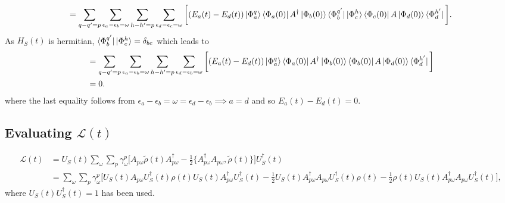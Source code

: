 \documentclass[10pt]{article}
\numberwithin{equation}{section}
\begin{document}
\begin{equation}
[H_{S},H_{LS}] =  \sum_{q-q' = p} \sum_{\epsilon_{a}-\epsilon_{b} = \omega}  \sum_{h-h' = p} \sum_{\epsilon_{d}-\epsilon_{c} = \omega}\bigg[(E_{a}(t)-E_{d}(t))\ket{\Phi_{a}^{q}}  \bra{\Phi_{a}(0)}A^{\dagger}\ket{\Phi_{b}(0)}\bra{\Phi_{b}^{q'}}\ket{\Phi_{c}^{h}}\bra{\Phi_{c}(0)}A\ket{\Phi_{d}(0)}\bra{\Phi_{d}^{h'}}\bigg].
\end{equation}
As $H_{S}(t)$ is hermitian, $\bra{\Phi_{b}^{q'}}\ket{\Phi_{c}^{h}} = \delta_{bc}$ which leads to 
\begin{align}
[H_{S},H_{LS}] &=  \sum_{q-q' = p} \sum_{\epsilon_{a}-\epsilon_{b} = \omega}  \sum_{h-h' = p} \sum_{\epsilon_{d}-\epsilon_{b} = \omega}\bigg[(E_{a}(t)-E_{d}(t))\ket{\Phi_{a}^{q}}  \bra{\Phi_{a}(0)}A^{\dagger}\ket{\Phi_{b}(0)}\bra{\Phi_{b}(0)}A\ket{\Phi_{d}(0)}\bra{\Phi_{d}^{h'}}\bigg] \\
                      &= 0.
\end{align}
where the last equality follows from $\epsilon_{a}-\epsilon_{b} = \omega = \epsilon_{d}-\epsilon_{b} \implies a=d$ and so $E_{a}(t)-E_{d}(t)=0$.








\subsection{Evaluating $\mathcal{L}(t)$}
\begin{align} \label{eq:24}
\mathcal{L}(t) &= U_{S}(t)\sum_{\omega}\sum_{p}\gamma_{\omega}^{p} \bigg[A_{p\omega}\tilde{\rho}(t)A_{p\omega}^{\dagger} - \frac{1}{2}\{A_{p\omega}^{\dagger}A_{p\omega},\tilde{\rho}(t)\}\bigg] U^{\dagger}_{S}(t) \\
&= \sum_{\omega}\sum_{p}\gamma_{\omega}^{p} \bigg[U_{S}(t)A_{p\omega}U^{\dagger}_{S}(t)\rho(t)U_{S}(t)A_{p\omega}^{\dagger}U^{\dagger}_{S}(t) - \frac{1}{2}U_{S}(t)A_{p\omega}^{\dagger}A_{p\omega}U^{\dagger}_{S}(t)\rho(t)-\frac{1}{2}\rho(t)U_{S}(t)A_{p\omega}^{\dagger}A_{p\omega}U^{\dagger}_{S}(t)\bigg],
\end{align}
where $U_{S}(t)U^{\dagger}_{S}(t)=1$ has been used.
\end{document}
